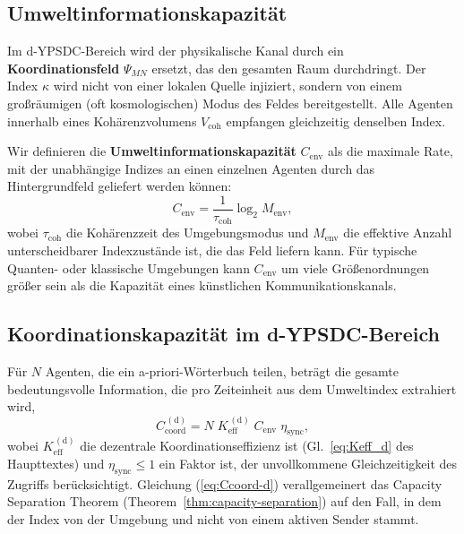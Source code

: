 \documentclass[12pt,a4paper]{article}
\theoremstyle{remark}
\begin{document}
	\subsection{Umweltinformationskapazität}
	\label{subsec:env-capacity}
	
	Im d-YPSDC-Bereich wird der physikalische Kanal durch ein \textbf{Koordinationsfeld} $\Psi_{MN}$ ersetzt, das den gesamten Raum durchdringt. Der Index $\kappa$ wird nicht von einer lokalen Quelle injiziert, sondern von einem großräumigen (oft kosmologischen) Modus des Feldes bereitgestellt. Alle Agenten innerhalb eines Kohärenzvolumens $V_{\mathrm{coh}}$ empfangen gleichzeitig denselben Index.
	
	Wir definieren die \textbf{Umweltinformationskapazität} $C_{\mathrm{env}}$ als die maximale Rate, mit der unabhängige Indizes an einen einzelnen Agenten durch das Hintergrundfeld geliefert werden können:
	\begin{equation}
		C_{\mathrm{env}} = \frac{1}{\tau_{\mathrm{coh}}} \log_2 M_{\mathrm{env}},
		\label{eq:Cenv}
	\end{equation}
	wobei $\tau_{\mathrm{coh}}$ die Kohärenzzeit des Umgebungsmodus und $M_{\mathrm{env}}$ die effektive Anzahl unterscheidbarer Indexzustände ist, die das Feld liefern kann. Für typische Quanten- oder klassische Umgebungen kann $C_{\mathrm{env}}$ um viele Größenordnungen größer sein als die Kapazität eines künstlichen Kommunikationskanals.
	
	\subsection{Koordinationskapazität im d-YPSDC-Bereich}
	\label{subsec:coord-capacity-dypsdc}
	
	Für $N$ Agenten, die ein a-priori-Wörterbuch teilen, beträgt die gesamte bedeutungsvolle Information, die pro Zeiteinheit aus dem Umweltindex extrahiert wird,
	\begin{equation}
		C_{\mathrm{coord}}^{\,(\mathrm{d})} = N \; K_{\mathrm{eff}}^{\,(\mathrm{d})} \;
		C_{\mathrm{env}} \; \eta_{\mathrm{sync}},
		\label{eq:Ccoord-d}
	\end{equation}
	wobei $K_{\mathrm{eff}}^{\,(\mathrm{d})}$ die dezentrale Koordinationseffizienz ist (Gl.\ \eqref{eq:Keff_d} des Haupttextes) und $\eta_{\mathrm{sync}} \le 1$ ein Faktor ist, der unvollkommene Gleichzeitigkeit des Zugriffs berücksichtigt. Gleichung (\ref{eq:Ccoord-d}) verallgemeinert das Capacity Separation Theorem (Theorem~\ref{thm:capacity-separation}) auf den Fall, in dem der Index von der Umgebung und nicht von einem aktiven Sender stammt.
	
\end{document}

